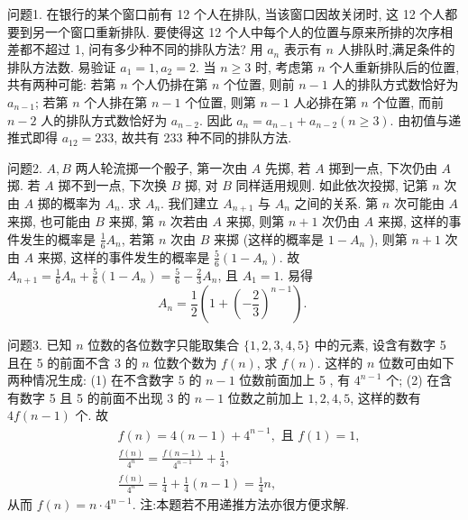 
问题1. 在银行的某个窗口前有 12 个人在排队, 当该窗口因故关闭时, 这 12 个人都要到另一个窗口重新排队.
要使得这 12 个人中每个人的位置与原来所排的次序相差都不超过 1, 问有多少种不同的排队方法?
用 $a_n$ 表示有 $n$ 人排队时,满足条件的排队方法数.
易验证 $a_1=1, a_2=2$.
当 $n \geqslant 3$ 时, 考虑第 $n$ 个人重新排队后的位置, 共有两种可能:
若第 $n$ 个人仍排在第 $n$ 个位置, 则前 $n-1$ 人的排队方式数恰好为 $a_{n-1}$;
若第 $n$ 个人排在第 $n-1$ 个位置, 则第 $n-1$ 人必排在第 $n$ 个位置, 而前 $n-2$ 人的排队方式数恰好为 $a_{n-2}$.
因此 $a_n=a_{n-1}+a_{n-2}(n \geqslant 3)$.
由初值与递推式即得 $a_{12}=233$, 故共有 233 种不同的排队方法.



问题2. $A, B$ 两人轮流掷一个骰子, 第一次由 $A$ 先掷, 若 $A$ 掷到一点, 下次仍由 $A$ 掷.
若 $A$ 掷不到一点, 下次换 $B$ 掷, 对 $B$ 同样适用规则.
如此依次投掷, 记第 $n$ 次由 $A$ 掷的概率为 $A_n$. 求 $A_n$.
我们建立 $A_{n+1}$ 与 $A_n$ 之间的关系.
第 $n$ 次可能由 $A$ 来掷, 也可能由 $B$ 来掷, 第 $n$ 次若由 $A$ 来掷, 则第 $n+1$ 次仍由 $A$ 来掷, 这样的事件发生的概率是 $\frac{1}{6} A_n$, 若第 $n$ 次由 $B$ 来掷 (这样的概率是 $1-A_n$ ), 则第 $n+1$ 次由 $A$ 来掷, 这样的事件发生的概率是 $\frac{5}{6}\left(1-A_n\right)$.
故 $A_{n+1}=\frac{1}{6} A_n+\frac{5}{6}\left(1-A_n\right)=\frac{5}{6}-\frac{2}{3} A_n$, 且 $A_1=1$. 易得
$$
A_n=\frac{1}{2}\left(1+\left(-\frac{2}{3}\right)^{n-1}\right) \text {. }
$$



问题3. 已知 $n$ 位数的各位数字只能取集合 $\{1,2,3,4,5\}$ 中的元素, 设含有数字 5 且在 5 的前面不含 3 的 $n$ 位数个数为 $f(n)$, 求 $f(n)$.
这样的 $n$ 位数可由如下两种情况生成:
(1) 在不含数字 5 的 $n-1$ 位数前面加上 5 , 有 $4^{n-1}$ 个;
(2) 在含有数字 5 且 5 的前面不出现 3 的 $n-1$ 位数之前加上 $1,2,4,5$, 这样的数有 $4 f(n-1)$ 个.
故
$$
\begin{aligned}
& f(n)=4(n-1)+4^{n-1}, \text { 且 } f(1)=1, \\
& \frac{f(n)}{4^n}=\frac{f(n-1)}{4^{n-1}}+\frac{1}{4}, \\
& \frac{f(n)}{4^n}=\frac{1}{4}+\frac{1}{4}(n-1)=\frac{1}{4} n,
\end{aligned}
$$
从而 $f(n)=n \cdot 4^{n-1}$.
注:本题若不用递推方法亦很方便求解.



